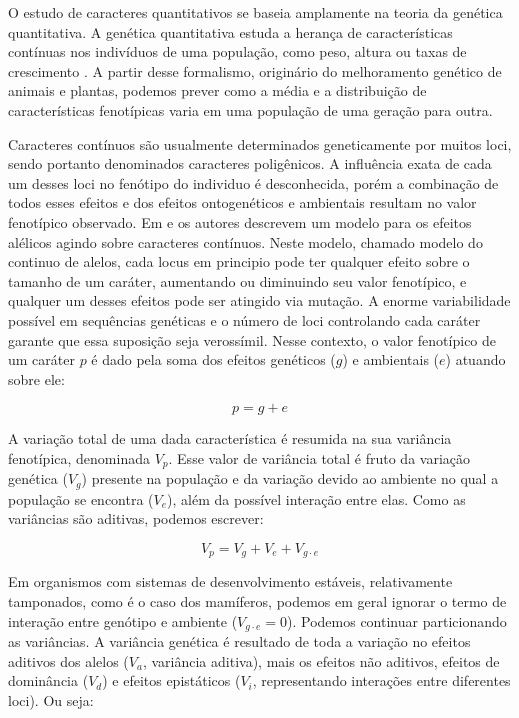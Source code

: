 O estudo de caracteres quantitativos se baseia amplamente na teoria da
genética quantitativa.
A genética quantitativa estuda a herança de características contínuas
nos indivíduos de uma população, como peso, altura ou taxas de
crescimento \citep{Falconer1996}.
A partir desse formalismo, originário do melhoramento genético de animais e plantas, 
podemos prever como a média e a distribuição de
características fenotípicas varia em uma população de uma geração para
outra.

Caracteres contínuos são usualmente determinados geneticamente por muitos loci,
sendo portanto denominados caracteres poligênicos.
A influência exata de cada um desses loci no fenótipo do individuo é
desconhecida, porém a combinação de todos esses efeitos e dos efeitos
ontogenéticos e ambientais resultam no valor fenotípico observado.
Em \cite{Crow1964} e \cite{Kimura1965} os autores descrevem um modelo
para os efeitos alélicos agindo sobre caracteres contínuos.
Neste modelo, chamado modelo do continuo de alelos, cada locus em
principio pode ter qualquer efeito sobre o tamanho de um caráter,
aumentando ou diminuindo seu valor fenotípico, e
qualquer um desses efeitos pode ser atingido via mutação.
A enorme variabilidade possível em sequências genéticas e o número de
loci controlando cada caráter garante que essa suposição seja verossímil.
Nesse contexto, o valor fenotípico de um caráter $p$ é dado pela soma dos
efeitos genéticos ($g$) e ambientais ($e$) atuando sobre ele:

\begin{equation}
    p = g + e
\end{equation}

A variação total de uma dada característica é resumida na sua variância
fenotípica, denominada $V_p$.
Esse valor de variância total é fruto da variação genética ($V_g$)
presente na população e da variação devido ao ambiente no qual a
população se encontra ($V_e$), além da possível interação entre elas.
Como as variâncias são aditivas, podemos escrever:

\begin{equation}
    V_p = V_g + V_e + V_{g \cdot e}
\end{equation}

Em organismos com sistemas de desenvolvimento estáveis, relativamente
tamponados, como é o caso dos mamíferos, podemos em geral ignorar o
termo de interação entre genótipo e ambiente ($V_{g \cdot e} = 0$).
Podemos continuar particionando as variâncias.
A variância genética é resultado de toda a variação no efeitos 
aditivos dos alelos ($V_a$, variância aditiva), mais os efeitos não
aditivos, efeitos de dominância ($V_d$) e efeitos
epistáticos ($V_i$, representando interações entre diferentes loci).
Ou seja:

